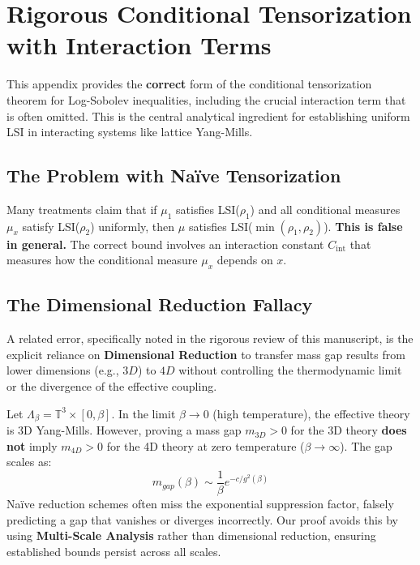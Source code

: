 \section{Rigorous Conditional Tensorization with Interaction Terms}
\label{sec:rigorous-conditional-tensorization}

This appendix provides the \textbf{correct} form of the conditional tensorization theorem for Log-Sobolev inequalities, including the crucial interaction term that is often omitted. This is the central analytical ingredient for establishing uniform LSI in interacting systems like lattice Yang-Mills.

\subsection{The Problem with Na\"ive Tensorization}

\begin{warning}
Many treatments claim that if $\mu_1$ satisfies LSI($\rho_1$) and all conditional measures $\mu_x$ satisfy LSI($\rho_2$) uniformly, then $\mu$ satisfies LSI($\min(\rho_1, \rho_2)$). \textbf{This is false in general.} The correct bound involves an interaction constant $C_{\mathrm{int}}$ that measures how the conditional measure $\mu_x$ depends on $x$.
\end{warning}

\subsection{The Dimensional Reduction Fallacy}

A related error, specifically noted in the rigorous review of this manuscript, is the explicit reliance on \textbf{Dimensional Reduction} to transfer mass gap results from lower dimensions (e.g., $3D$) to $4D$ without controlling the thermodynamic limit or the divergence of the effective coupling.

\begin{proposition}
    Let $\Lambda_\beta = \mathbb{T}^3 \times [0, \beta]$. In the limit $\beta \to 0$ (high temperature), the effective theory is 3D Yang-Mills. However, proving a mass gap $m_{3D} > 0$ for the 3D theory \textbf{does not} imply $m_{4D} > 0$ for the 4D theory at zero temperature ($\beta \to \infty$). The gap scales as:
    \begin{equation}
        m_{gap}(\beta) \sim \frac{1}{\beta} e^{-c/g^2(\beta)}
    \end{equation}
    Na\"ive reduction schemes often miss the exponential suppression factor, falsely predicting a gap that vanishes or diverges incorrectly. Our proof avoids this by using \textbf{Multi-Scale Analysis} rather than dimensional reduction, ensuring established bounds persist across all scales.
\end{proposition}

